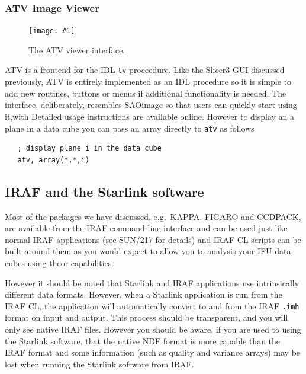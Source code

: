 \documentclass[twoside,11pt]{article}
\newcommand{\htmladdnormallink}[2]{#1}
\newcommand{\htmladdimg}[1]{}
\newcommand{\xref}[3]{#1}
\newcommand{\xlabel}[1]{}
\newcommand{\myfig} [5] {
  \begin{figure}
    \centering\texttt{[image: \#1]}
    \typeout{#1 inserted on page \arabic{page}}
    \caption{\label{#4}#5}
  \end{figure}
  }
\newcommand{\myfig}[5]{
    \label{#4} \htmladdimg{#3}\\
    Figure: #5\\
    }
\begin{document}
\subsubsection{ATV Image Viewer}

\myfig{sc16_atv.eps}{height=0.4\textheight}{sc16_atv.gif}{sc16_atv_fig}{The ATV viewer interface.} 

\htmladdnormallink{ATV}{http://cfa-www.harvard.edu/~abarth/atv/} is a frontend for the IDL {\tt tv} proceedure. Like the Slicer3 GUI discussed previously, ATV is entirely implemented as an IDL \htmladdnormallink{procedure}{http://cfa-www.harvard.edu/~abarth/atv/atv.pro} so it is simple to add new routines, buttons or menus if additional functionality is needed. The interface, deliberately, resembles SAOimage so that users can quickly start using it,with Detailed usage \htmladdnormallink{instructions}{http://cfa-www.harvard.edu/~abarth/atv/instructions.html} are available online. However to display an a plane in a data cube you can pass an array directly to {\tt atv} as follows

\small\begin{verbatim}
   ; display plane i in the data cube
   atv, array(*,*,i)
\end{verbatim}\normalsize

\subsection{\xlabel{sc16_irafstar}IRAF and the Starlink software\label{sc16_irafstar}}

Most of the packages we have discussed, e.g.\ \xref{KAPPA}{sun95}{}, \xref{FIGARO}{sun86}{} and \xref{CCDPACK}{sun139}{}, are available from the IRAF command line interface and can be used just like normal IRAF applications (see \xref{SUN/217}{sun217}{} for details) and IRAF CL scripts can be built around them as you would expect to allow you to analysis your IFU data cubes using theor capabilities.

However it should be noted that Starlink and IRAF applications use intrinsically different data formats. However, when a Starlink application is run from the
IRAF CL, the application will automatically convert to and from the IRAF {\tt .imh} format on input and output. This process should be transparent, and you will only see native IRAF files. However you should be aware, if you are used to using the Starlink software, that the native NDF format is more capable than the IRAF format and some information (such as quality and variance arrays) may be lost when running the Starlink software from IRAF.
\end{document}
